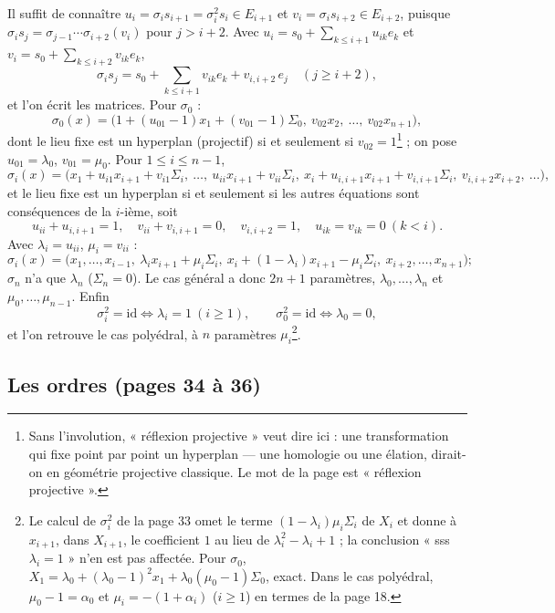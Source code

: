 \documentclass[11pt,a4paper]{article}
\begin{document}
Il suffit de connaître $u_i = \sigma_i s_{i+1} = \sigma_i^2 s_i \in E_{i+1}$ et
$v_i = \sigma_i s_{i+2} \in E_{i+2}$, puisque $\sigma_i s_j = \sigma_{j-1}\cdots
\sigma_{i+2}(v_i)$ pour $j > i + 2$. Avec $u_i = s_0 + \sum_{k \leq i+1}
u_{ik}e_k$ et $v_i = s_0 + \sum_{k \leq i+2} v_{ik}e_k$,
\[
\sigma_i s_j = s_0 + \sum_{k \leq i+1} v_{ik}e_k + v_{i,i+2}\,e_j \quad (j \geq i
+ 2),
\]
et l'on écrit les matrices. Pour $\sigma_0$ :
\[
\sigma_0(x) = \bigl(1 + (u_{01} - 1)x_1 + (v_{01} - 1)\Sigma_0,\ v_{02}x_2,\
\dots,\ v_{02}x_{n+1}\bigr),
\]
dont le lieu fixe est un hyperplan (projectif) si et seulement si $v_{02} =
1$\footnote{Sans l'involution, « réflexion projective » veut dire ici : une
transformation qui fixe point par point un hyperplan --- une homologie ou une
élation, dirait-on en géométrie projective classique. Le mot de la page est
« réflexion projective ».} ; on pose $u_{01} = \lambda_0$, $v_{01} = \mu_0$.
Pour $1 \leq i \leq n - 1$,
\[
\sigma_i(x) = \bigl(x_1 + u_{i1}x_{i+1} + v_{i1}\Sigma_i,\ \dots,\ u_{ii}x_{i+1} +
v_{ii}\Sigma_i,\ x_i + u_{i,i+1}x_{i+1} + v_{i,i+1}\Sigma_i,\
v_{i,i+2}x_{i+2},\ \dots\bigr),
\]
et le lieu fixe est un hyperplan si et seulement si les autres équations sont
conséquences de la $i$-ième, soit
\[
u_{ii} + u_{i,i+1} = 1,\quad v_{ii} + v_{i,i+1} = 0,\quad v_{i,i+2} = 1,\quad
u_{ik} = v_{ik} = 0\ (k < i) .
\]
Avec $\lambda_i = u_{ii}$, $\mu_i = v_{ii}$ :
\[
\sigma_i(x) = \bigl(x_1, \dots, x_{i-1},\ \lambda_i x_{i+1} + \mu_i\Sigma_i,\
x_i + (1 - \lambda_i)x_{i+1} - \mu_i\Sigma_i,\ x_{i+2}, \dots, x_{n+1}\bigr) ;
\]
$\sigma_n$ n'a que $\lambda_n$ ($\Sigma_n = 0$). Le cas général a donc $2n + 1$
paramètres, $\lambda_0, \dots, \lambda_n$ et $\mu_0, \dots, \mu_{n-1}$. Enfin
\[
\sigma_i^2 = \mathrm{id} \iff \lambda_i = 1 \ (i \geq 1), \qquad
\sigma_0^2 = \mathrm{id} \iff \lambda_0 = 0 ,
\]
et l'on retrouve le cas polyédral, à $n$ paramètres $\mu_i$\footnote{Le calcul
de $\sigma_i^2$ de la page 33 omet le terme $(1 - \lambda_i)\mu_i\Sigma_i$ de
$X_i$ et donne à $x_{i+1}$, dans $X_{i+1}$, le coefficient $1$ au lieu de
$\lambda_i^2 - \lambda_i + 1$ ; la conclusion « sss $\lambda_i = 1$ » n'en est pas
affectée. Pour $\sigma_0$, $X_1 = \lambda_0 + (\lambda_0 - 1)^2x_1 +
\lambda_0(\mu_0 - 1)\Sigma_0$, exact. Dans le cas polyédral, $\mu_0 - 1 =
\alpha_0$ et $\mu_i = -(1 + \alpha_i)$ ($i \geq 1$) en termes de la page 18.}.

\pagerange{34}{36}
\subsection*{Les ordres (pages 34 à 36)}
\end{document}
